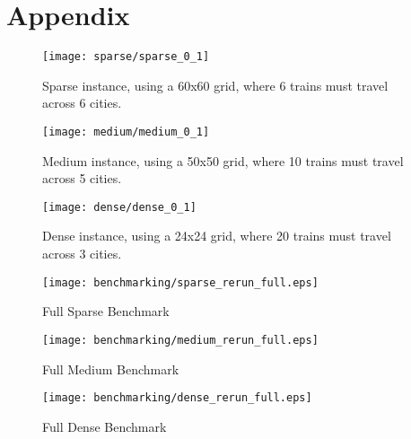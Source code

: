 \appendix
\clearpage
\section{Appendix}
\label{sec:appendix}

\begin{figure}[h]
	\centering
	\texttt{[image: sparse/sparse\_0\_1]}
	\caption{Sparse instance, using a 60x60 grid, where 6 trains must travel across 6 cities.}
	\label{sparse_0_1_fullpage}
\end{figure}

\begin{figure}[h]
	\centering
	\texttt{[image: medium/medium\_0\_1]}
	\caption{Medium instance, using a 50x50 grid, where 10 trains must travel across 5 cities.}
	\label{medium_0_1_fullpage}
\end{figure}

\begin{figure}[h]
	\centering
	\texttt{[image: dense/dense\_0\_1]}
	\caption{Dense instance, using a 24x24 grid, where 20 trains must travel across 3 cities.}
	\label{dense_0_1_fullpage}
\end{figure}

\begin{figure}[h]
	\centering
	\texttt{[image: benchmarking/sparse\_rerun\_full.eps]}
	\caption{Full Sparse Benchmark}
	\label{dense_0_1_fullpage}
\end{figure}

\begin{figure}[h]
	\centering
	\texttt{[image: benchmarking/medium\_rerun\_full.eps]}
	\caption{Full Medium Benchmark}
	\label{dense_0_1_fullpage}
\end{figure}

\begin{figure}[h]
	\centering
	\texttt{[image: benchmarking/dense\_rerun\_full.eps]}
	\caption{Full Dense Benchmark}
	\label{dense_0_1_fullpage}
\end{figure}